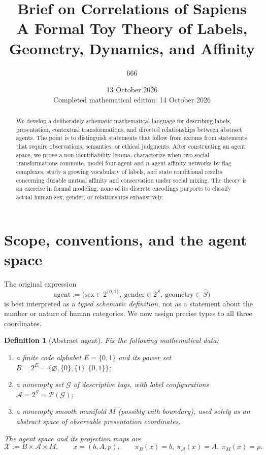 \documentclass[11pt,a4paper]{article}
\title{\textbf{Brief on Correlations of Sapiens}\\[3pt]
\large A Formal Toy Theory of Labels, Geometry, Dynamics, and Affinity}
\author{666}
\date{13 October 2026\\[5pt]\small Completed mathematical edition: 14 October 2026}
\numberwithin{equation}{section}
\newtheorem{definition}{Definition}[section]
\theoremstyle{remark}
\newcommand{\Pow}{\mathcal{P}}
\newcommand{\G}{\mathcal{G}}
\newcommand{\A}{\mathcal{A}}
\newcommand{\X}{\mathcal{X}}
\newcommand{\1}{\mathbf{1}}
\begin{document}
\maketitle
\begin{abstract}
We develop a deliberately schematic mathematical language for describing
labels, presentation, contextual transformations, and directed relationships
between abstract agents.  The point is to distinguish statements that follow
from axioms from statements that require observations, semantics, or ethical
judgments.  After constructing an agent space, we prove a non-identifiability
lemma, characterize when two social transformations commute, model
four-agent and $n$-agent affinity networks by flag complexes, study a growing
vocabulary of labels, and state conditional results concerning durable mutual
affinity and conservation under social mixing.  The theory is an exercise in
formal modeling: none of its discrete encodings purports to classify actual
human sex, gender, or relationships exhaustively.
\end{abstract}
\tableofcontents

\section{Scope, conventions, and the agent space}

The original expression
\begin{equation}\label{eq:original-skeleton}
\mathrm{agent}:=\bigl(\mathrm{sex}\in2^{\{0,1\}},\
\mathrm{gender}\in2^{\mathit S},\
\mathrm{geometry}\subset\widehat S\bigr)
\end{equation}
is best interpreted as a \emph{typed schematic definition}, not as a
statement about the number or nature of human categories.  We now assign
precise types to all three coordinates.

\begin{definition}[Abstract agent]\label{def:agent}
Fix the following mathematical data:
\begin{enumerate}[label=(\roman*)]
\item a finite \emph{code alphabet} $E=\{0,1\}$ and its power set
      $B=2^E=\{\varnothing,\{0\},\{1\},\{0,1\}\}$;
\item a nonempty set $\G$ of descriptive tags, with label configurations
      $\A=2^{\G}=\Pow(\G)$;
\item a nonempty smooth manifold $M$ (possibly with boundary), used solely
      as an abstract space of observable \emph{presentation coordinates}.
\end{enumerate}
The \emph{agent space} and its projection maps are
\begin{equation}\label{eq:agent-space}
\boxed{\X:=B\times\A\times M,\qquad
x=(b,A,p),\qquad \pi_B(x)=b,\ \pi_\A(x)=A,\ \pi_M(x)=p.}
\end{equation}
\end{definition}
\end{document}
